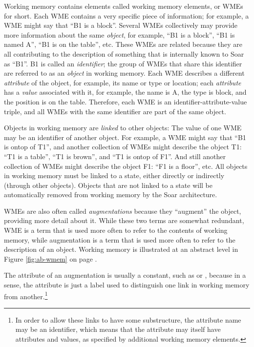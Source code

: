 Working memory contains elements called working memory elements, or WMEs for
short. Each WME contains a very specific piece of information; for example, a WME
might say that ``B1 is a block''. 
Several WMEs collectively may provide more information about the same
\textit{object}, for example, ``B1 is a block'', ``B1 is named A'', ``B1 is on
the table'', etc. These WMEs are related because they are all contributing to
the description of something that is internally known to Soar as ``B1''. B1 is
called an \textit{identifier}; the group of WMEs that share this identifier
are referred to as an \textit{object} in working memory. 
Each WME describes a different \textit{attribute} of the object, for example,
its name or type or location; each \textit{attribute} has a \textit{value} associated
with it, for example, the name is A, the type is block, and the position is on
the table. Therefore, each WME is an identifier-attribute-value triple, and
all WMEs with the same identifier are part of the same object.

Objects in working memory are \emph{linked} to other objects: The value of one
WME may be an identifier of another object. For example, a WME might say that
``B1 is ontop of T1'', and another collection of WMEs might describe the
object T1: ``T1 is a table'', ``T1 is brown'', and ``T1 is ontop of F1''. And
still another collection of WMEs might describe the object F1: ``F1 is a
floor'', etc. All objects in working memory must be linked to a state, either
directly or indirectly (through other objects). Objects that are not linked to
a state will be automatically removed from working memory by the Soar
architecture. 

WMEs are also often called \textit{augmentations} because they
``augment'' the object, providing more detail about it. While these two
terms are somewhat redundant, WME is a term that is used more often to
refer to the contents of working memory, while augmentation is a term
that is used more often to refer to the description of an object.
Working memory is illustrated at an abstract level in Figure
\ref{fig:ab-wmem} on page \pageref{fig:ab-wmem}. 


The attribute of an augmentation is usually a constant, such as  or
, because in a sense, the attribute is just a label used to
distinguish one link in working memory from another.\footnote{In order to
allow these links to have some substructure, the attribute name may be an
identifier, which means that the attribute may itself have attributes and
values, as specified by additional working memory elements.}

